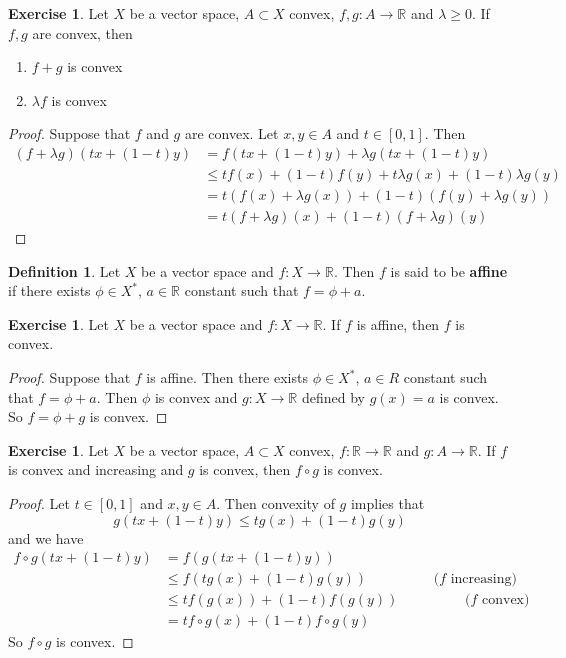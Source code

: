 \documentclass[12pt]{amsart}
\theoremstyle{definition}
\newtheorem{defn}[definition]{Definition}
\newtheorem{ex}[definition]{Exercise}
\newcommand{\lam}{\lambda}
\newcommand{\R}{\mathbb{R}}
\newcommand{\tbf}[1]{\textbf{#1}}
\DeclareMathOperator*{\0}{\mbf{0}}
\DeclareMathOperator*{\1}{\mbf{1}}
\newcommand{\lex}[1]{\label{ex:#1}}
\newcommand{\ld}[1]{\label{defn:#1}}
\begin{document}
	\begin{ex} \lex{91005}
	Let $X$ be a vector space, $A \subset X$ convex, $f,g:A \rightarrow \R$ and $\lam \geq 0$. If $f,g$ are convex, then 
	\begin{enumerate}
	\item $f + g$ is convex 
	\item $\lam f$ is convex
	\end{enumerate}
	\end{ex}
	
	\begin{proof}
	Suppose that $f$ and $g$ are convex. Let $x,y \in A$ and $t \in [0,1]$. Then 
	\begin{align*}
	(f + \lam g)(tx + (1-t)y) 
	&= f(tx + (1-t)y) + \lam g(tx + (1-t)y) \\
	& \leq tf(x) + (1-t)f(y) +  t \lam g(x) + (1-t)\lam g(y) \\
	&= t(f(x) + \lam g(x)) + (1-t)(f(y) + \lam g(y))\\
	& = t(f + \lam g)(x) + (1-t)(f + \lam g)(y)
\end{align*}		 
	\end{proof}
	
	
	\begin{defn} \ld{91006}
	Let $X$ be a vector space and $f: X \rightarrow \R$. Then $f$ is said to be \tbf{affine} if there exists $\phi \in X^*$, $a \in \R$ constant such that $f = \phi + a$.\\
	\end{defn}
	
	\begin{ex} \lex{91007}
	Let $X$ be a vector space and $f: X \rightarrow \R$. If $f$ is affine, then $f$ is convex.
	\end{ex}
	
	\begin{proof}
	Suppose that $f$ is affine. Then there exists $\phi \in X^*$, $a \in R$ constant such that $f = \phi + a$. Then $\phi$ is convex and $g: X \rightarrow \R$ defined by $g(x) = a$ is convex. So $f = \phi + g$ is convex.
	\end{proof}
	
	\begin{ex} \lex{91008}
	Let $X$ be a vector space, $A \subset X$ convex, $f:\R \rightarrow \R$ and $g: A \rightarrow \R$. If $f$ is convex and increasing and $g$ is convex, then $f \circ g$ is convex.
	\end{ex}	
	
	\begin{proof}
	Let $t \in [0,1]$ and $x, y \in A$. Then convexity of $g$ implies that $$g(tx +(1-t)y) \leq tg(x) + (1-t)g(y)$$ and we have
	\begin{align*}
	f\circ g(tx +(1-t)y) 
	&= f(g(tx +(1-t)y)) \\
	& \leq f(tg(x) + (1-t)g(y)) \hspace{2cm} (f \text{ increasing)}\\
	& \leq tf(g(x)) + (1-t)f(g(y)) \hspace{2cm}  (f \text{ convex)}\\	
	&= tf \circ g(x) + (1-t)f \circ g(y)
\end{align*}	 
So $f \circ g$ is convex.
	\end{proof}
	
\end{document}
